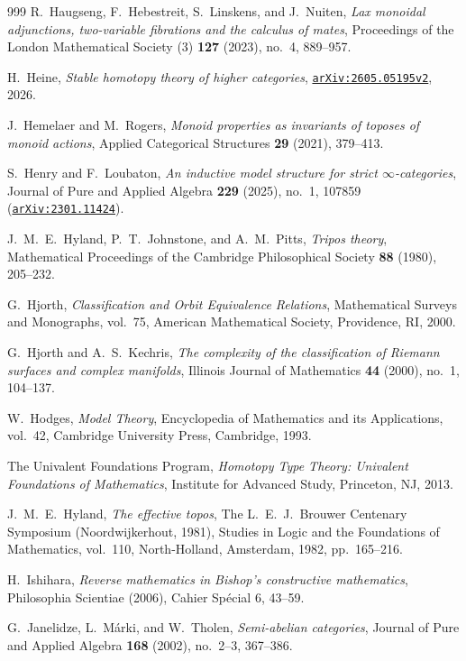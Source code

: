 \documentclass[10pt,twoside,openright]{book}
\theoremstyle{crmplain}
\theoremstyle{crmdef}
\theoremstyle{crmremark}
\begin{document}
\begin{thebibliography}{999}
R.~Haugseng, F.~Hebestreit, S.~Linskens, and J.~Nuiten,
\emph{Lax monoidal adjunctions, two-variable fibrations and the calculus of mates},
Proceedings of the London Mathematical Society (3) \textbf{127} (2023), no.~4, 889--957.

H.~Heine,
\emph{Stable homotopy theory of higher categories},
\href{https://arxiv.org/abs/2605.05195v2}{\texttt{arXiv:2605.05195v2}}, 2026.

J.~Hemelaer and M.~Rogers,
\emph{Monoid properties as invariants of toposes of monoid actions},
Applied Categorical Structures \textbf{29} (2021), 379--413.

S.~Henry and F.~Loubaton,
\emph{An inductive model structure for strict $\infty$-categories},
Journal of Pure and Applied Algebra \textbf{229} (2025), no.~1, 107859 (\href{https://arxiv.org/abs/2301.11424}{\texttt{arXiv:2301.11424}}).

J.~M.~E.~Hyland, P.~T.~Johnstone, and A.~M.~Pitts,
\emph{Tripos theory},
Mathematical Proceedings of the Cambridge Philosophical Society \textbf{88} (1980), 205--232.

G.~Hjorth,
\emph{Classification and Orbit Equivalence Relations},
Mathematical Surveys and Monographs, vol.~75, American Mathematical Society, Providence, RI, 2000.

G.~Hjorth and A.~S.~Kechris,
\emph{The complexity of the classification of Riemann surfaces and complex manifolds},
Illinois Journal of Mathematics \textbf{44} (2000), no.~1, 104--137.

W.~Hodges,
\emph{Model Theory},
Encyclopedia of Mathematics and its Applications, vol.~42, Cambridge University Press, Cambridge, 1993.

The Univalent Foundations Program,
\emph{Homotopy Type Theory: Univalent Foundations of Mathematics},
Institute for Advanced Study, Princeton, NJ, 2013.

J.~M.~E.~Hyland,
\emph{The effective topos},
The L.~E.~J.~Brouwer Centenary Symposium (Noordwijkerhout, 1981), Studies in Logic and the Foundations of Mathematics, vol.~110, North-Holland, Amsterdam, 1982, pp.~165--216.

H.~Ishihara,
\emph{Reverse mathematics in Bishop's constructive mathematics},
Philosophia Scientiae (2006), Cahier Sp\'ecial 6, 43--59.

G.~Janelidze, L.~M\'arki, and W.~Tholen,
\emph{Semi-abelian categories},
Journal of Pure and Applied Algebra \textbf{168} (2002), no.~2--3, 367--386.


\end{thebibliography}
\end{document}
